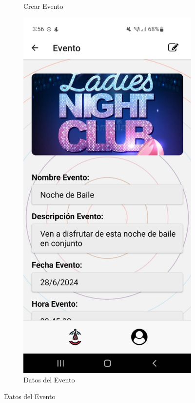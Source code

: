 \begin{figure}[H]
\begin{subfigure}{0.45\textwidth}
        \caption{Crear Evento}
        \label{fig:img5}
    \end{subfigure}%
    \hfill
    \begin{subfigure}{0.45\textwidth}
        \centering
        \includegraphics[width=\linewidth]{imagenes/Capturas/DatosEventoAdmin.jpeg}
        \caption{Datos del Evento}
        \label{fig:img6}
    \end{subfigure}
\end{figure}
\vspace*{\fill}

